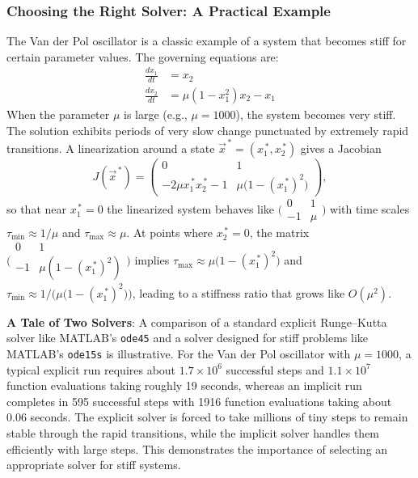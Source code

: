 \subsubsection{Choosing the Right Solver: A Practical Example}
The Van der Pol oscillator is a classic example of a system that becomes stiff for certain parameter values. The governing equations are:
\begin{align}
    \frac{dx_1}{dt} &= x_2 \\
    \frac{dx_2}{dt} &= \mu(1 - x_1^2)x_2 - x_1
\end{align}
When the parameter $\mu$ is large (e.g., $\mu=1000$), the system becomes very stiff. The solution exhibits periods of very slow change punctuated by extremely rapid transitions. A linearization around a state $\vec{x}^{\,*}=(x_1^{\,*},x_2^{\,*})$ gives a Jacobian
\begin{equation}
    J(\vec{x}^{\,*}) = \begin{pmatrix} 0 & 1 \\ -2\mu x_1^{\,*}x_2^{\,*} - 1 & \mu\big(1-(x_1^{\,*})^2\big) \end{pmatrix},
\end{equation}
so that near $x_1^{\,*}=0$ the linearized system behaves like $\big(\begin{smallmatrix}0&1\\-1&\mu\end{smallmatrix}\big)$ with time scales $\tau_{\min}\approx 1/\mu$ and $\tau_{\max}\approx \mu$. At points where $x_2^{\,*}=0$, the matrix $\big(\begin{smallmatrix}0&1\\-1&\mu(1-(x_1^{\,*})^2)\end{smallmatrix}\big)$ implies $\tau_{\max}\approx \mu\big(1-(x_1^{\,*})^2\big)$ and $\tau_{\min}\approx 1/\big(\mu\big(1-(x_1^{\,*})^2\big)\big)$, leading to a stiffness ratio that grows like $O(\mu^2)$.

\begin{warningBox}
    \textbf{A Tale of Two Solvers}: A comparison of a standard explicit Runge--Kutta solver like MATLAB's \texttt{ode45} and a solver designed for stiff problems like MATLAB's \texttt{ode15s} is illustrative. For the Van der Pol oscillator with $\mu=1000$, a typical explicit run requires about $1.7\times 10^6$ successful steps and $1.1\times 10^7$ function evaluations taking roughly 19 seconds, whereas an implicit run completes in 595 successful steps with 1916 function evaluations taking about 0.06 seconds. The explicit solver is forced to take millions of tiny steps to remain stable through the rapid transitions, while the implicit solver handles them efficiently with large steps. This demonstrates the importance of selecting an appropriate solver for stiff systems.
\end{warningBox}

